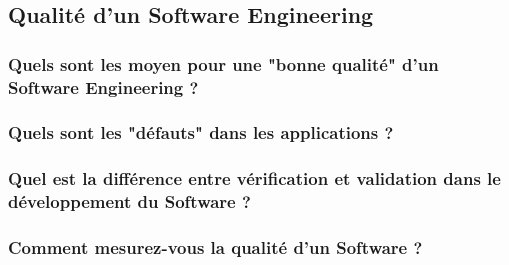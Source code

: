 \subsection{Qualité d'un Software Engineering}

\subsubsection{Quels sont les moyen pour une "bonne qualité" d'un Software Engineering ?}
\subsubsection{Quels sont les "défauts" dans les applications ?}
\subsubsection{Quel est la différence entre vérification et validation dans le développement du Software ?}
\subsubsection{Comment mesurez-vous la qualité d'un Software ?}